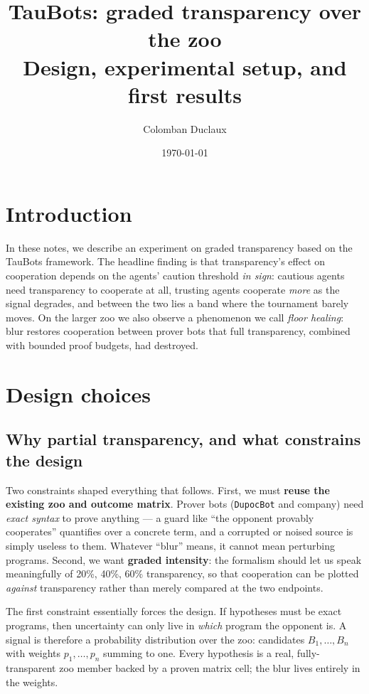 \documentclass[11pt]{article}
\title{TauBots: graded transparency over the zoo\\
\large Design, experimental setup, and first results}
\author{Colomban Duclaux}
\date{\today}
\newcommand{\zoobot}[1]{\texttt{#1}}
\newcommand{\dupoc}{\zoobot{DupocBot}}
\begin{document}
\maketitle

\section{Introduction}
In these notes, we describe an experiment on graded transparency based on the TauBots framework. The headline finding is that transparency's effect on cooperation depends on the agents' caution
threshold \emph{in sign}: cautious agents need transparency to cooperate at
all, trusting agents cooperate \emph{more} as the signal degrades, and between
the two lies a band where the tournament barely moves. On the larger zoo we
also observe a phenomenon we call \emph{floor healing}: blur restores
cooperation between prover bots that full transparency, combined with bounded
proof budgets, had destroyed.

\section{Design choices}

\subsection{Why partial transparency, and what constrains the design}

Two constraints shaped everything that follows. First, we must \textbf{reuse
the existing zoo and outcome matrix}. Prover bots (\dupoc{} and company) need
\emph{exact syntax} to prove anything --- a guard like ``the opponent
provably cooperates'' quantifies over a concrete term, and a corrupted or
noised source is simply useless to them. Whatever ``blur'' means, it cannot
mean perturbing programs. Second, we want \textbf{graded intensity}: the
formalism should let us speak meaningfully of 20\%, 40\%, 60\% transparency,
so that cooperation can be plotted \emph{against} transparency rather than
merely compared at the two endpoints.

The first constraint essentially forces the design. If hypotheses must be
exact programs, then uncertainty can only live in \emph{which} program the
opponent is. A signal is therefore a probability distribution over the zoo:
candidates $B_1, \dots, B_n$ with weights $p_1, \dots, p_n$ summing to one.
Every hypothesis is a real, fully-transparent zoo member backed by a proven
matrix cell; the blur lives entirely in the weights.
\end{document}
